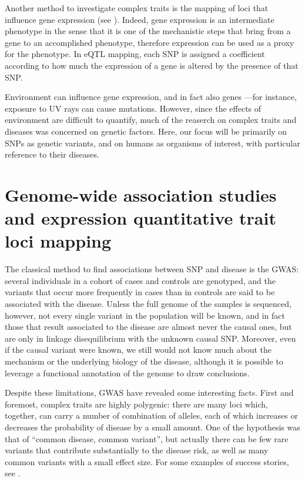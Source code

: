 \documentclass[../main.tex]{subfiles}
\begin{document}
Another method to investigate complex traits is the mapping of loci that 
influence gene expression (see ). Indeed, gene expression 
is an intermediate phenotype in the sense that it is one of the 
mechanistic steps that bring from a gene to an accomplished phenotype, 
therefore expression can be used as a proxy for the phenotype. In eQTL 
mapping, each SNP is assigned a coefficient according to how much the 
expression of a gene is altered by the presence of that SNP.

Environment can influence gene expression, and in fact also genes ---for 
instance, exposure to UV rays can cause mutations. However, since the 
effects of environment are difficult to quantify, much of the reaserch 
on complex traits and diseases was concerned on genetic factors. Here, 
our focus will be primarily on SNPs as genetic variants, and on humans 
as organisms of interest, with particular reference to their diseases.

\section{Genome-wide association studies and expression quantitative 
	trait loci mapping}


The classical method to find associations between SNP and disease is the 
GWAS: several individuals in a cohort of cases and controls are 
genotyped, and the variants that occur more frequently in cases than in 
controls are said to be associated with the disease. Unless the full 
genome of the samples is sequenced, however, not every single variant in 
the population will be known, and in fact those that result associated 
to the disease are almost never the causal ones, but are only in linkage 
disequilibrium with the unknown causal SNP\cite{Visscher2012}. Moreover, 
even if the causal variant were known, we still would not know much 
about the mechanism or the underlying biology of the disease, although 
it is possible to leverage a functional annotation of the genome to draw 
conclusions.

Despite these limitations, GWAS have revealed some interesting facts. 
First and foremost, complex traits are highly 
polygenic\cite{Visscher2017}: there are many loci which, together, can 
carry a number of combination of alleles, each of which increases or 
decreases the probability of disease by a small amount. One of the 
hypothesis was that of \enquote{common disease, common variant}, but 
actually there can be few rare variants that contribute substantially to 
the disease risk, as well as many common variants with a small effect 
size. For some examples of success stories, see 
.
\end{document}
